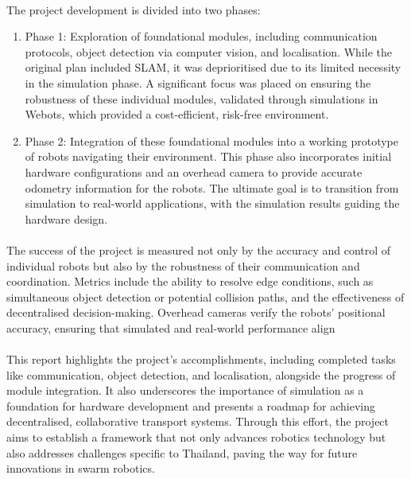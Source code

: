 \paragraph*{}
The project development is divided into two phases:

\begin{enumerate}
    \item Phase 1: Exploration of foundational modules, including communication protocols, object detection via computer vision, and localisation. While the original plan included SLAM, it was deprioritised due to its limited necessity in the simulation phase.  A significant focus was placed on ensuring the robustness of these individual modules, validated through simulations in Webots, which provided a cost-efficient, risk-free environment.
    \item Phase 2: Integration of these foundational modules into a working prototype of robots navigating their environment. This phase also incorporates initial hardware configurations and an overhead camera to provide accurate odometry information for the robots. The ultimate goal is to transition from simulation to real-world applications, with the simulation results guiding the hardware design.
\end{enumerate}

\paragraph*{}
The success of the project is measured not only by the accuracy and control of individual robots but also by the robustness of their communication and coordination. Metrics include the ability to resolve edge conditions, such as simultaneous object detection or potential collision paths, and the effectiveness of decentralised decision-making. Overhead cameras verify the robots’ positional accuracy, ensuring that simulated and real-world performance align

\paragraph*{}
This report highlights the project’s accomplishments, including completed tasks like communication, object detection, and localisation, alongside the progress of module integration. It also underscores the importance of simulation as a foundation for hardware development and presents a roadmap for achieving decentralised, collaborative transport systems. Through this effort, the project aims to establish a framework that not only advances robotics technology but also addresses challenges specific to Thailand, paving the way for future innovations in swarm robotics.

